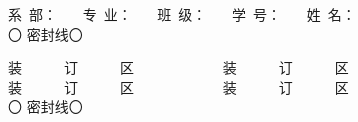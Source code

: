 \sbox{\zdxa}
{	\parbox{27cm}{\centering \heiti \hspace{1cm}
		系~部：\underline{\makebox[25mm][c]{}}~~~
		专~业：\underline{\makebox[25mm][c]{}}~~~ 班~级：\underline{\makebox[45mm][c]{}}~~~  学~号：\underline{\makebox[25mm][c]{}}~~~
		姓~名：\underline{\makebox[25mm][c]{}} \\
		\vspace{1mm}
	  \dotfill{} 〇 \dotfill{} 密\dotfill{}封\dotfill{}线\dotfill{}〇\dotfill{} \\
}}
\newsavebox{\zdxb}%
\sbox{\zdxb}
{\parbox{27cm}{\centering \heiti
		\vspace{25mm}
		装~~~~~~订~~~~~~区~~~~~~~~~~~~
		装~~~~~~订~~~~~~区~~~~~~ ~~~~~~
		装~~~~~~订~~~~~~区~~~~~~~~~~~~
		装~~~~~~订~~~~~~区\\
		\vspace{6mm}
		\dotfill{} 〇 \dotfill{}密\dotfill{}封\dotfill{}线\dotfill{}〇\dotfill{} \\
}}

\newcommand{\putzdx}{
		\hspace{-1.7cm}\parbox{1cm}{\vspace{-1.5cm}
			\rotatebox[origin=c]{90}{
				\usebox{\zdxa}
		}}
}
\newcommand{\putzdxx}{
	\hspace{0.3cm}\parbox{1cm}{\vspace{-1.5cm}
		\rotatebox[origin=c]{-90}{
			\usebox{\zdxb}
	}}
}


\usepackage{ifthen}

\newlength{\la}
\newlength{\lb}
\newlength{\lc}
\newlength{\ld}
\newlength{\lee}
\newlength{\lf}
\newlength{\lhalf}
\newlength{\lquarter}
\newlength{\lmax}
\newcommand{\xx}[4]{\\[.5pt]%
	\settowidth{\la}{A、#1~~~}  
	\settowidth{\lb}{B、#2~~~}
	\settowidth{\lc}{C、#3~~~}  
	\settowidth{\ld}{D、#4~~~}  
	\ifthenelse{\lengthtest{\la > \lb}}
	{\setlength{\lmax}{\la}}{\setlength{\lmax}{\lb}}  
		\ifthenelse{\lengthtest{\lmax < \lc}}  {\setlength{\lmax}{\lc}}  {}  \ifthenelse{\lengthtest{\lmax < \ld}}  {\setlength{\lmax}{\ld}}  {} 
	    \setlength{\lhalf}{0.5\linewidth} 
	    \setlength{\lquarter}{0.25\linewidth}
	    \ifthenelse{\lengthtest{\lmax > \lhalf}}  
	    {\noindent{}A、#1 \\ B、#2 \\ C、#3 \\ D、#4 }  {  \ifthenelse{\lengthtest{\lmax > \lquarter}}  
	    	{\noindent
	    	 \makebox[\lhalf][l]{A、#1~~~}%
	    	 \makebox[\lhalf][l]{B、#2~~~}\\%
	    	 \makebox[\lhalf][l]{C、#3~~~}%
	    	 \makebox[\lhalf][l]{D、#4~~~}}%
    		 {\noindent\makebox[\lquarter][l]{A、#1~~~}%
    		 \makebox[\lquarter][l]{B、#2~~~}%
    		 \makebox[\lquarter][l]{C、#3~~~}%
    		 \makebox[\lquarter][l]{D、#4~~~}}
    	 }}
     
